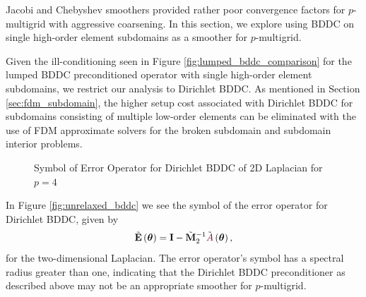 Jacobi and Chebyshev smoothers provided rather poor convergence factors for $p$-multigrid with aggressive coarsening.
In this section, we explore using BDDC on single high-order element subdomains as a smoother for $p$-multigrid.

Given the ill-conditioning seen in Figure \ref{fig:lumped_bddc_comparison} for the lumped BDDC preconditioned operator with single high-order element subdomains, we restrict our analysis to Dirichlet BDDC.
As mentioned in Section \ref{sec:fdm_subdomain}, the higher setup cost associated with Dirichlet BDDC for subdomains consisting of multiple low-order elements can be eliminated with the use of FDM approximate solvers for the broken subdomain and subdomain interior problems.

\begin{figure}[!ht]
  \centering
  \hfill
  \caption{Symbol of Error Operator for Dirichlet BDDC of 2D Laplacian for $p = 4$}
\end{figure}

In Figure \ref{fig:unrelaxed_bddc} we see the symbol of the error operator for Dirichlet BDDC, given by
\begin{equation}
\tilde{\mathbf{E}} \left( \boldsymbol{\theta} \right) = \mathbf{I} - \tilde{\mathbf{M}}_2^{-1} \tilde{{\color{burgundy}A}} \left( \boldsymbol{\theta} \right),
\end{equation}
for the two-dimensional Laplacian.
The error operator's symbol has a spectral radius greater than one, indicating that the Dirichlet BDDC preconditioner as described above may not be an appropriate smoother for $p$-multigrid.

